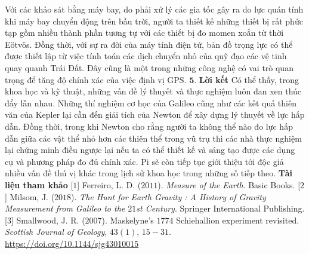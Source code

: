 \begin{multicols}{2}
	Với các khảo sát bằng máy bay, do phải xử lý các gia tốc gây ra do lực quán tính khi máy bay chuyển động trên bầu trời, người ta thiết kế những thiết bị rất phức tạp gồm nhiều thành phần tương tự với các thiết bị đo momen xoắn từ thời Eötvös. Đồng thời, với sự ra đời của máy tính điện tử, bản đồ trọng lực có thể được thiết lập từ việc tính toán các dịch chuyển nhỏ của quỹ đạo các vệ tinh quay quanh Trái Đất. Đây cũng là một trong những công nghệ có vai trò quan trọng để tăng độ chính xác của việc định vị GPS.
	\vskip 0.1cm
	$\pmb{5.}$ \textbf{\color{timhieukhoahoc}Lời kết}
	\vskip 0.1cm
	Có thể thấy, trong khoa học và kỹ thuật, những vấn đề lý thuyết và thực nghiệm luôn đan xen thúc đẩy lẫn nhau. Những thí nghiệm cơ học của Galileo cũng như các kết quả thiên văn của Kepler lại cần đến giải tích của Newton để xây dựng lý thuyết về lực hấp dẫn. Đồng thời, trong khi Newton cho rằng người ta không thể nào đo lực hấp dẫn giữa các vật thể nhỏ hơn các thiên thể trong vũ trụ thì các nhà thực nghiệm lại chứng minh điều ngược lại nếu ta có thể thiết kế và sáng tạo được các dụng cụ và phương pháp đo đủ chính xác. Pi sẽ còn tiếp tục giới thiệu tới độc giả nhiều vấn đề thú vị khác trong lịch sử khoa học trong những số tiếp theo.
	\vskip 0.1cm
	\vskip 0.1cm
	\textbf{\color{timhieukhoahoc}Tài liệu tham khảo}
	\vskip 0.1cm
	[$1$] Ferreiro, L. D. ($2011$). \textit{Measure of the Earth}. Basic Books.
	\vskip 0.1cm
	[$2$] Milsom, J. ($2018$). \textit{The Hunt for Earth Gravity : A History of Gravity Measurement from Galileo to the $21$st Century}. Springer International Publishing.
	\vskip 0.1cm
	[$3$] Smallwood, J. R. ($2007$). Maskelyne's $1774$ Schiehallion experiment revisited. \textit{Scottish Journal of Geology}, $43(1)$, $15-31$. \url{https://doi.org/10.1144/sjg43010015}
\end{multicols}


